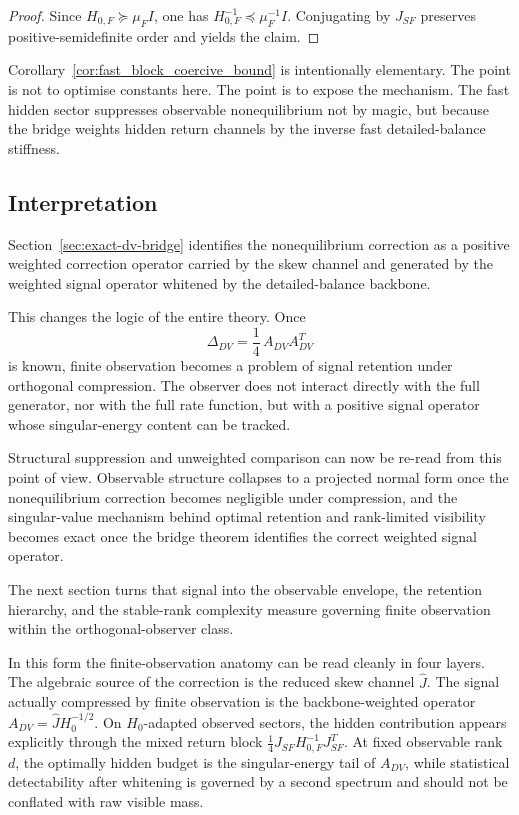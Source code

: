\documentclass[11pt,a4paper]{article}
\numberwithin{equation}{section}
\theoremstyle{thmcompact}
\theoremstyle{remark}
\begin{document}
\begin{proof}
Since \(H_{0,F}\succeq \mu_F I\), one has \(H_{0,F}^{-1}\preceq \mu_F^{-1}I\). Conjugating by \(J_{SF}\) preserves positive-semidefinite order and yields the claim.
\end{proof}

Corollary~\ref{cor:fast_block_coercive_bound} is intentionally elementary. The point is not to optimise constants here. The point is to expose the mechanism. The fast hidden sector suppresses observable nonequilibrium not by magic, but because the bridge weights hidden return channels by the inverse fast detailed-balance stiffness.

\subsection{Interpretation}

Section~\ref{sec:exact-dv-bridge} identifies the nonequilibrium correction as a positive weighted correction operator carried by the skew channel and generated by the weighted signal operator whitened by the detailed-balance backbone.

This changes the logic of the entire theory. Once
\begin{equation}
\Delta_{DV}=\frac14\,A_{DV}A_{DV}^{T}
\end{equation}
is known, finite observation becomes a problem of signal retention under orthogonal compression. The observer does not interact directly with the full generator, nor with the full rate function, but with a positive signal operator whose singular-energy content can be tracked.

Structural suppression and unweighted comparison can now be re-read from this point of view. Observable structure collapses to a projected normal form once the nonequilibrium correction becomes negligible under compression, and the singular-value mechanism behind optimal retention and rank-limited visibility becomes exact once the bridge theorem identifies the correct weighted signal operator.

The next section turns that signal into the observable envelope, the retention hierarchy, and the stable-rank complexity measure governing finite observation within the orthogonal-observer class.

In this form the finite-observation anatomy can be read cleanly in four layers. The algebraic source of the correction is the reduced skew channel \(\widehat J\). The signal actually compressed by finite observation is the backbone-weighted operator \(A_{DV}=\widehat J H_0^{-1/2}\). On \(H_0\)-adapted observed sectors, the hidden contribution appears explicitly through the mixed return block \(\tfrac14 J_{SF}H_{0,F}^{-1}J_{SF}^T\). At fixed observable rank \(d\), the optimally hidden budget is the singular-energy tail of \(A_{DV}\), while statistical detectability after whitening is governed by a second spectrum and should not be conflated with raw visible mass.
\end{document}
